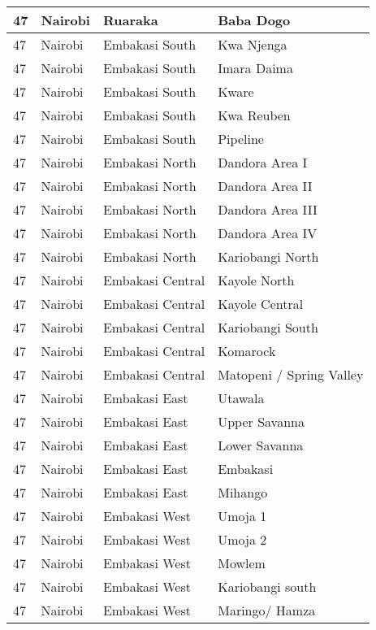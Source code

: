 \begin{table}[!ht]
\begin{tabular}{|l|l|l|l|}
        47 & Nairobi & Ruaraka & Baba Dogo \\ \hline
        47 & Nairobi & Embakasi South & Kwa Njenga \\ \hline
        47 & Nairobi & Embakasi South & Imara Daima \\ \hline
        47 & Nairobi & Embakasi South & Kware \\ \hline
        47 & Nairobi & Embakasi South & Kwa Reuben \\ \hline
        47 & Nairobi & Embakasi South & Pipeline \\ \hline
        47 & Nairobi & Embakasi North & Dandora Area I \\ \hline
        47 & Nairobi & Embakasi North & Dandora Area II \\ \hline
        47 & Nairobi & Embakasi North & Dandora Area III \\ \hline
        47 & Nairobi & Embakasi North & Dandora Area IV \\ \hline
        47 & Nairobi & Embakasi North & Kariobangi North \\ \hline
        47 & Nairobi & Embakasi Central & Kayole North \\ \hline
        47 & Nairobi & Embakasi Central & Kayole Central \\ \hline
        47 & Nairobi & Embakasi Central & Kariobangi South \\ \hline
        47 & Nairobi & Embakasi Central & Komarock \\ \hline
        47 & Nairobi & Embakasi Central & Matopeni / Spring Valley \\ \hline
        47 & Nairobi & Embakasi East & Utawala \\ \hline
        47 & Nairobi & Embakasi East & Upper Savanna \\ \hline
        47 & Nairobi & Embakasi East & Lower Savanna \\ \hline
        47 & Nairobi & Embakasi East & Embakasi \\ \hline
        47 & Nairobi & Embakasi East & Mihango \\ \hline
        47 & Nairobi & Embakasi West & Umoja 1 \\ \hline
        47 & Nairobi & Embakasi West & Umoja 2 \\ \hline
        47 & Nairobi & Embakasi West & Mowlem \\ \hline
        47 & Nairobi & Embakasi West & Kariobangi south \\ \hline
        47 & Nairobi & Embakasi West & Maringo/ Hamza \\ \hline

\end{tabular}
\end{table}
